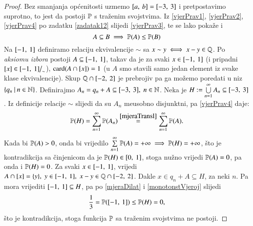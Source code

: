 
\begin{proof}
    Bez smanjanja op\' cenitosti uzmemo $[{a}, \:{b}]
    = [{-3}, \:{3}]$ i pretpostavimo suprotno, to jest da postoji
    $\mathbb{P}$ s tra\v zenim svojstvima. Iz \eqref{vjerPrav1},
    \eqref{vjerPrav2}, \eqref{vjerPrav4} po zadatku \ref{zadatak12}
    slijedi \eqref{vjerPrav3}, te se lako poka\v ze i
    \begin{equation} \label{monotonstVjeroj}
        A \subseteq B \implies \mathbb{P}({A}) \leq \mathbb{P}({B})
    \end{equation}
    Na $[{-1}, \:{1}]$ definiramo relaciju ekvivalencije $\sim$
    sa $x \sim y \iff x - y \in \mathbb{Q}$. Po \emph{aksiomu izbora} postoji
    $A \subseteq [{-1}, \:{1}]$, takav da je za svaki $x \in
    [{-1}, \:{1}]$ (i pripadni $[x] \in [{-1}, \:{1}] \big/
    _{\sim}$), $\textnormal{card}({A \cap [x]}) = 1$ (u $A$ smo stavili samo jedan
    element iz svake klase ekvivalencije).
    Skup $\mathbb{Q} \cap [{-2}, \:{2}]$ je prebrojiv pa ga mo\v zemo
    poredati u niz $\{ q_n \: | \: n \in \mathbb{N} \}$.
    Definirajmo $A_n = q_n + A \subseteq [{-3}, \:{3}], \; n \in
    \mathbb{N}$. Neka je $H := \bigcup\limits_{n=1}^{\infty} A_n \subseteq
    [{-3}, \:{3}]$. 
    Iz definicije relacije $\sim$ slijedi da su $A_n$ me\dj usobno
    disjunktni, pa \eqref{vjerPrav4} daje:
    \begin{equation*}
        \mathbb{P}({H}) = \sum\limits_{n=1}^{\infty} \mathbb{P}({A_n})
            \overset{\eqref{mjeraTransl}}{=} \sum\limits_{n=1}^{\infty}
            \mathbb{P}({A}).
    \end{equation*}
    Kada bi $\mathbb{P}({A}) > 0$, onda bi vrijedilo $\sum\limits_{n=1}^{\infty}
    \mathbb{P}({A}) = + \infty \implies \mathbb{P}({H}) = +\infty$, \v sto je
    kontradikcija sa \v cinjenicom da je $\mathbb{P}({H}) \in
    [{0}, \:{1}]$, stoga nu\v zno vrijedi $\mathbb{P}({A}) = 0$, pa onda
    i $\mathbb{P}({H}) = 0$.
    Za svaki $x \in [{-1}, \:{1}]$, vrijedi $A \cap [x] = \{y\},
    \; y \in [{-1}, \:{1}], \; x - y \in \mathbb{Q} \cap [{-2}, \:{2}]$.
    Dakle $x \in q_n + A \subseteq H$, za neki $n$. Pa mora vrijediti
    $[{-1}, \:{1}] \subseteq H$, pa po \eqref{mjeraDilat} i
    \eqref{monotonstVjeroj} slijedi
    \begin{equation*}
        \frac{1}{3} = \mathbb{P}({[{-1}, \:{1}]}) \leq \mathbb{P}({H}) = 0,
    \end{equation*}
    \v sto je kontradikcija, stoga funkcija $\mathbb{P}$ sa tra\v zenim
    svojstvima ne postoji.
\end{proof}

